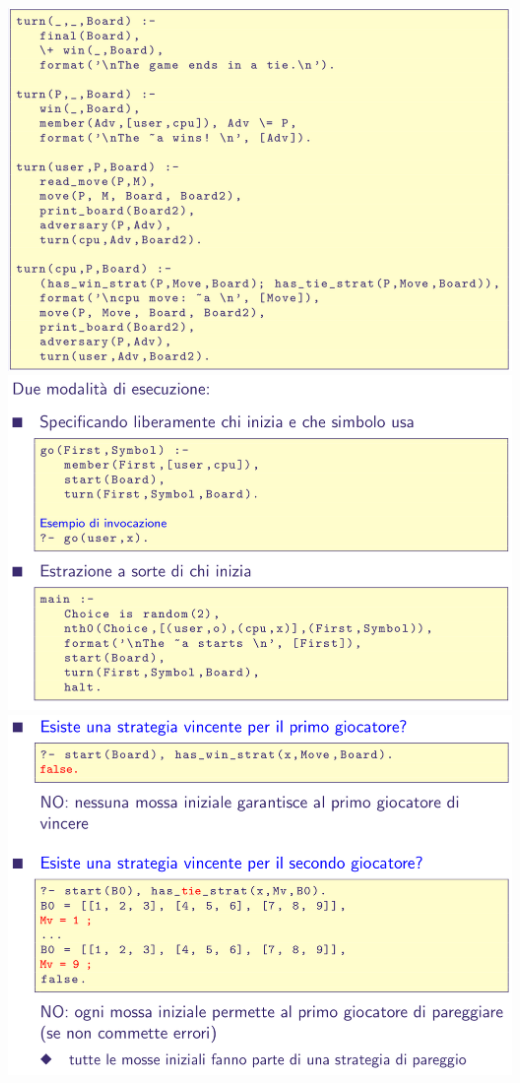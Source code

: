 \documentclass[10pt]{article}
\begin{document}
\\
\includegraphics[scale=0.25]{Immagini/pl49.png}
\\
\includegraphics[scale=0.25]{Immagini/pl50.png}
\\
\includegraphics[scale=0.25]{Immagini/pl51.png}
\end{document}
